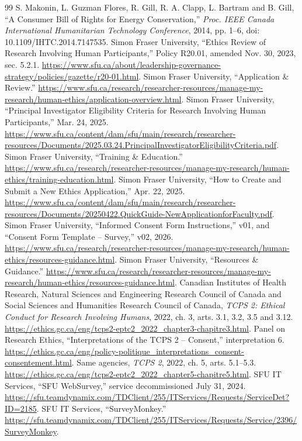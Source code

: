 \documentclass[11pt,letterpaper]{article}
\begin{document}
\begin{thebibliography}{99}
 S. Makonin, L. Guzman Flores, R. Gill, R. A. Clapp, L. Bartram and B. Gill, ``A Consumer Bill of Rights for Energy Conservation,'' \emph{Proc. IEEE Canada International Humanitarian Technology Conference}, 2014, pp. 1--6, doi: 10.1109/IHTC.2014.7147535.
 Simon Fraser University, ``Ethics Review of Research Involving Human Participants,'' Policy R20.01, amended Nov. 30, 2023, sec. 5.2.1. \url{https://www.sfu.ca/about/leadership-governance-strategy/policies/gazette/r20-01.html}.
 Simon Fraser University, ``Application \& Review.'' \url{https://www.sfu.ca/research/researcher-resources/manage-my-research/human-ethics/application-overview.html}.
 Simon Fraser University, ``Principal Investigator Eligibility Criteria for Research Involving Human Participants,'' Mar. 24, 2025. \url{https://www.sfu.ca/content/dam/sfu/main/research/researcher-resources/Documents/2025.03.24.PrincipalInvestigatorEligibilityCriteria.pdf}.
 Simon Fraser University, ``Training \& Education.'' \url{https://www.sfu.ca/research/researcher-resources/manage-my-research/human-ethics/training-education.html}.
 Simon Fraser University, ``How to Create and Submit a New Ethics Application,'' Apr. 22, 2025. \url{https://www.sfu.ca/content/dam/sfu/main/research/researcher-resources/Documents/20250422.QuickGuide-NewApplicationforFaculty.pdf}.
 Simon Fraser University, ``Informed Consent Form Instructions,'' v01, and ``Consent Form Template -- Survey,'' v02, 2026. \url{https://www.sfu.ca/research/researcher-resources/manage-my-research/human-ethics/resources-guidance.html}.
 Simon Fraser University, ``Resources \& Guidance.'' \url{https://www.sfu.ca/research/researcher-resources/manage-my-research/human-ethics/resources-guidance.html}.
 Canadian Institutes of Health Research, Natural Sciences and Engineering Research Council of Canada and Social Sciences and Humanities Research Council of Canada, \emph{TCPS 2: Ethical Conduct for Research Involving Humans}, 2022, ch. 3, arts. 3.1, 3.2, 3.5 and 3.12. \url{https://ethics.gc.ca/eng/tcps2-eptc2_2022_chapter3-chapitre3.html}.
 Panel on Research Ethics, ``Interpretations of the TCPS 2 -- Consent,'' interpretation 6. \url{https://ethics.gc.ca/eng/policy-politique_interpretations_consent-consentement.html}.
 Same agencies, \emph{TCPS 2}, 2022, ch. 5, arts. 5.1--5.3. \url{https://ethics.gc.ca/eng/tcps2-eptc2_2022_chapter5-chapitre5.html}.
 SFU IT Services, ``SFU WebSurvey,'' service decommissioned July 31, 2024. \url{https://sfu.teamdynamix.com/TDClient/255/ITServices/Requests/ServiceDet?ID=2185}.
 SFU IT Services, ``SurveyMonkey.'' \url{https://sfu.teamdynamix.com/TDClient/255/ITServices/Requests/Service/2396/SurveyMonkey}.
\end{thebibliography}
\end{document}
